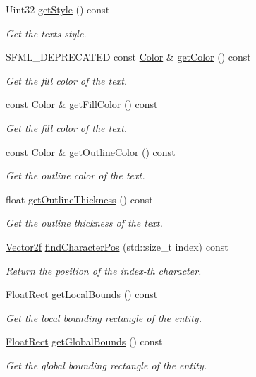\begin{DoxyCompactItemize}
Uint32 \hyperlink{classsf_1_1_text_a0da79b0c057f4bb51592465a205c35d7}{get\+Style} () const
\begin{DoxyCompactList}\small\item\em Get the text\textquotesingle{}s style. \end{DoxyCompactList}\item 
S\+F\+M\+L\+\_\+\+D\+E\+P\+R\+E\+C\+A\+T\+ED const \hyperlink{classsf_1_1_color}{Color} \& \hyperlink{classsf_1_1_text_a77ba664285efd72ab4ce85b9cbbeeb21}{get\+Color} () const
\begin{DoxyCompactList}\small\item\em Get the fill color of the text. \end{DoxyCompactList}\item 
const \hyperlink{classsf_1_1_color}{Color} \& \hyperlink{classsf_1_1_text_a6b4ba8c435b59e1e05f831e6230dc537}{get\+Fill\+Color} () const
\begin{DoxyCompactList}\small\item\em Get the fill color of the text. \end{DoxyCompactList}\item 
const \hyperlink{classsf_1_1_color}{Color} \& \hyperlink{classsf_1_1_text_a53559d563461089f1172571b375442dc}{get\+Outline\+Color} () const
\begin{DoxyCompactList}\small\item\em Get the outline color of the text. \end{DoxyCompactList}\item 
float \hyperlink{classsf_1_1_text_af6bf01c23189edf52c8b38708db6f3f6}{get\+Outline\+Thickness} () const
\begin{DoxyCompactList}\small\item\em Get the outline thickness of the text. \end{DoxyCompactList}\item 
\hyperlink{classsf_1_1_vector2}{Vector2f} \hyperlink{classsf_1_1_text_a2e252d8dcae3eb61c6c962c0bc674b12}{find\+Character\+Pos} (std\+::size\+\_\+t index) const
\begin{DoxyCompactList}\small\item\em Return the position of the {\itshape index-\/th} character. \end{DoxyCompactList}\item 
\hyperlink{classsf_1_1_rect}{Float\+Rect} \hyperlink{classsf_1_1_text_a3e6b3b298827f853b41165eee2cbbc66}{get\+Local\+Bounds} () const
\begin{DoxyCompactList}\small\item\em Get the local bounding rectangle of the entity. \end{DoxyCompactList}\item 
\hyperlink{classsf_1_1_rect}{Float\+Rect} \hyperlink{classsf_1_1_text_ad33ed96ce9fbe99610f7f8b6874a16b4}{get\+Global\+Bounds} () const
\begin{DoxyCompactList}\small\item\em Get the global bounding rectangle of the entity. \end{DoxyCompactList}\end{DoxyCompactItemize}
